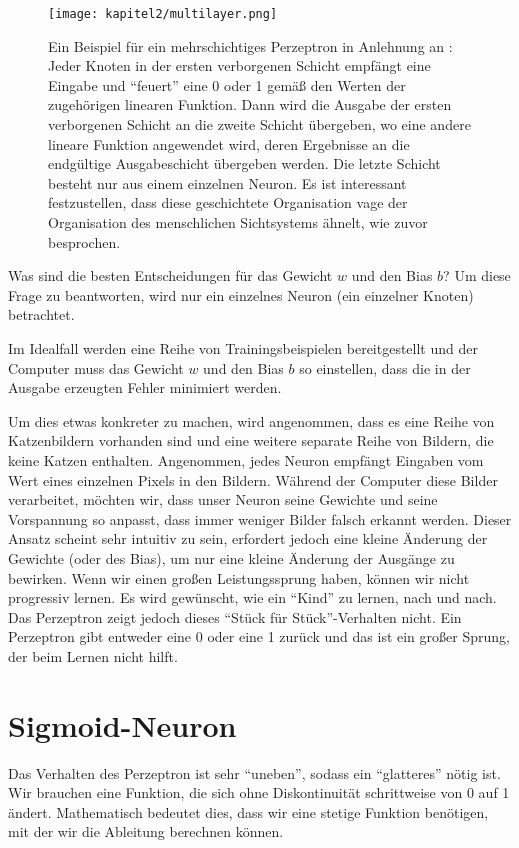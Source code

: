 \begin{figure}[H]
  \centering
  \texttt{[image: kapitel2/multilayer.png]}
  \caption[Das mehrschichtige Perzeptron]{Ein Beispiel für ein mehrschichtiges Perzeptron in Anlehnung an \cite{Taylor2017}: Jeder Knoten in der ersten verborgenen Schicht empfängt eine Eingabe und \enquote{feuert} eine 0 oder 1 gemäß den Werten der zugehörigen linearen Funktion. Dann wird die Ausgabe der ersten verborgenen Schicht an die zweite Schicht übergeben, wo eine andere lineare Funktion angewendet wird, deren Ergebnisse an die endgültige Ausgabeschicht übergeben werden. Die letzte Schicht besteht nur aus einem einzelnen Neuron. Es ist interessant festzustellen, dass diese geschichtete Organisation vage der Organisation des menschlichen Sichtsystems ähnelt, wie zuvor besprochen.}
  \label{Kap2:Multi}
\end{figure}

Was sind die besten Entscheidungen für das Gewicht $w$ und den Bias $b$? Um diese Frage zu beantworten, wird nur ein einzelnes Neuron (ein einzelner Knoten) betrachtet.

Im Idealfall werden eine Reihe von Trainingsbeispielen bereitgestellt und der Computer muss das Gewicht $w$ und den Bias $b$ so einstellen, dass die in der Ausgabe erzeugten Fehler minimiert werden.

Um dies etwas konkreter zu machen, wird angenommen, dass es eine Reihe von Katzenbildern vorhanden sind und eine weitere separate Reihe von Bildern, die keine Katzen enthalten. Angenommen, jedes Neuron empfängt Eingaben vom Wert eines einzelnen Pixels in den Bildern. Während der Computer diese Bilder verarbeitet, möchten wir, dass unser Neuron seine Gewichte und seine Vorspannung so anpasst, dass immer weniger Bilder falsch erkannt werden.
Dieser Ansatz scheint sehr intuitiv zu sein, erfordert jedoch eine kleine Änderung der Gewichte (oder des Bias), um nur eine kleine Änderung der Ausgänge zu bewirken. Wenn wir einen großen Leistungssprung haben, können wir nicht progressiv lernen. Es wird gewünscht, wie ein \enquote{Kind} zu lernen, nach und nach. Das Perzeptron zeigt jedoch dieses \enquote{Stück für Stück}-Verhalten nicht. Ein Perzeptron gibt entweder eine 0 oder eine 1 zurück und das ist ein großer Sprung, der beim Lernen nicht hilft.


\section{Sigmoid-Neuron}
Das Verhalten des Perzeptron ist sehr  \enquote{uneben}, sodass ein \enquote{glatteres} nötig ist. Wir brauchen eine Funktion, die sich ohne Diskontinuität schrittweise von 0 auf 1 ändert. Mathematisch bedeutet dies, dass wir eine stetige Funktion benötigen, mit der wir die Ableitung berechnen können.

